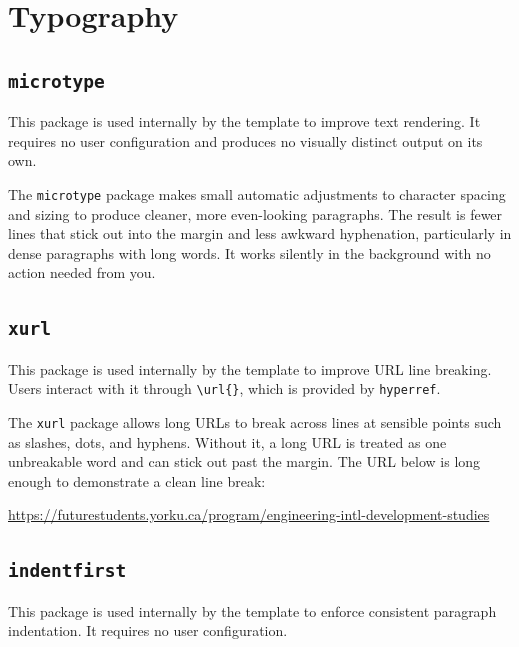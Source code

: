 \section{Typography}

\subsection{\texttt{microtype}}
\noindent\colorbox{themecolour!15}{\parbox{\linewidth}{\small This package is used internally by the template to improve text rendering. It requires no user configuration and produces no visually distinct output on its own.}}\vspace{0.5\baselineskip}

The \texttt{microtype} package makes small automatic adjustments to character spacing and sizing to produce cleaner, more even-looking paragraphs. The result is fewer lines that stick out into the margin and less awkward hyphenation, particularly in dense paragraphs with long words. It works silently in the background with no action needed from you.

\subsection{\texttt{xurl}}
\noindent\colorbox{themecolour!15}{\parbox{\linewidth}{\small This package is used internally by the template to improve URL line breaking. Users interact with it through \texttt{\textbackslash url\{\}}, which is provided by \texttt{hyperref}.}}\vspace{0.5\baselineskip}

The \texttt{xurl} package allows long URLs to break across lines at sensible points such as slashes, dots, and hyphens. Without it, a long URL is treated as one unbreakable word and can stick out past the margin. The URL below is long enough to demonstrate a clean line break:

\url{https://futurestudents.yorku.ca/program/engineering-intl-development-studies}

\subsection{\texttt{indentfirst}}
\noindent\colorbox{themecolour!15}{\parbox{\linewidth}{\small This package is used internally by the template to enforce consistent paragraph indentation. It requires no user configuration.}}\vspace{0.5\baselineskip}

